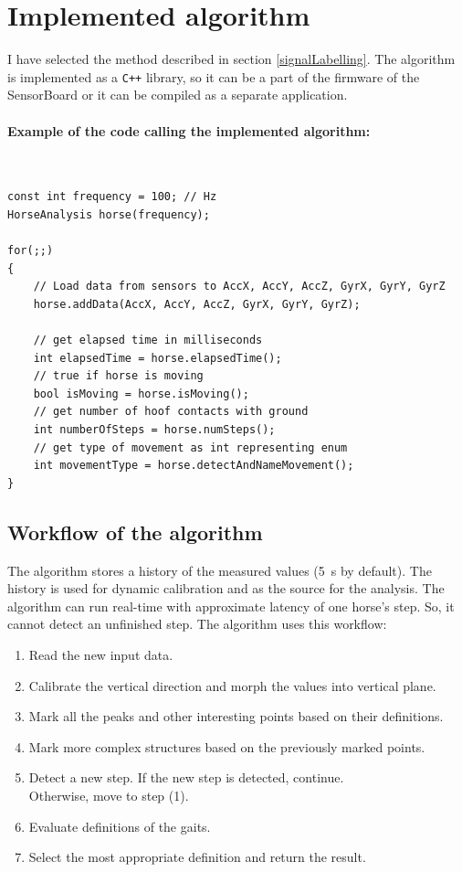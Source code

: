 \section{Implemented algorithm}
\label{implementedAnalysis}
I have selected the method described in section \ref{signalLabelling}. The algorithm is implemented as a \texttt{C++} library, so it can be a part of the firmware of the SensorBoard or it can be compiled as a separate application.

\paragraph{Example of the code calling the implemented algorithm:} \quad\\
\Cpp
\begin{lstlisting}
const int frequency = 100; // Hz
HorseAnalysis horse(frequency);

for(;;)
{
	// Load data from sensors to AccX, AccY, AccZ, GyrX, GyrY, GyrZ
	horse.addData(AccX, AccY, AccZ, GyrX, GyrY, GyrZ);
	
	// get elapsed time in milliseconds
	int elapsedTime = horse.elapsedTime();
	// true if horse is moving
	bool isMoving = horse.isMoving();
	// get number of hoof contacts with ground
	int numberOfSteps = horse.numSteps();
	// get type of movement as int representing enum
	int movementType = horse.detectAndNameMovement();
}
\end{lstlisting}

\subsection{Workflow of the algorithm}
The algorithm stores a history of the measured values (\SI{5}{s} by default). The history is used for dynamic calibration and as the source for the analysis. The algorithm can run real-time with approximate latency of one horse's step. So, it cannot detect an unfinished step. The algorithm uses this workflow:
\begin{enumerate}
	\item Read the new input data.
	\item Calibrate the vertical direction and morph the values into vertical plane.
	\item Mark all the peaks and other interesting points based on their definitions.
	\item Mark more complex structures based on the previously marked points.
	\item Detect a new step. If the new step is detected, continue.\\Otherwise, move to step (1).
	\item Evaluate definitions of the gaits.
	\item Select the most appropriate definition and return the result.
\end{enumerate}

